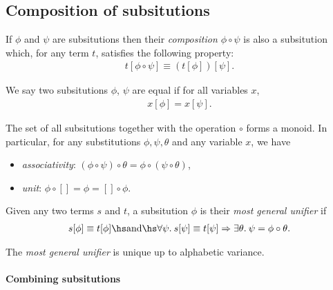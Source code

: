\documentclass{article}
\begin{document}
\subsection{Composition of subsitutions}

\begin{definition}
    If $\phi$ and $\psi$ are subsitutions then their \emph{composition $\phi\circ\psi$}
    is also a subsitution which, for any term $t$, satisfies the following property:
    \begin{align*}
        t[\phi\circ\psi] \equiv (t[\phi])[\psi].
    \end{align*}
\end{definition}

\begin{definition}
    We say two subsitutions $\phi$, $\psi$ are equal if for all variables $x$,
    \begin{align*}
        x[\phi] = x[\psi].
    \end{align*}
\end{definition}

\begin{theorem}
    The set of all subsitutions together with the operation $\circ$ forms a monoid. In particular,
    for any substitutions $\phi,\psi,\theta$ and any variable $x$, we have 
    \begin{itemize}
        \item \emph{associativity}: $(\phi \circ \psi) \circ \theta = \phi \circ (\psi \circ \theta)$,
        \item \emph{unit}: $\phi\circ[] = \phi = []\circ\phi$.
    \end{itemize}
\end{theorem}

\begin{definition}
    Given any two terms $s$ and $t$, a subsitution $\phi$ is their \emph{most general unifier}
    if 
    \begin{align*}
        s[\phi]\equiv t[\phi] \hs\text{and}\hs
        \forall \psi.\: s[\psi] \equiv t[\psi]  \Rightarrow \exists \theta.\: \psi = \phi \circ \theta.
    \end{align*}
\end{definition}

\begin{theorem}
    The \emph{most general unifier} is unique up to alphabetic variance.
\end{theorem}

\paragraph{Combining subsitutions}
\end{document}
